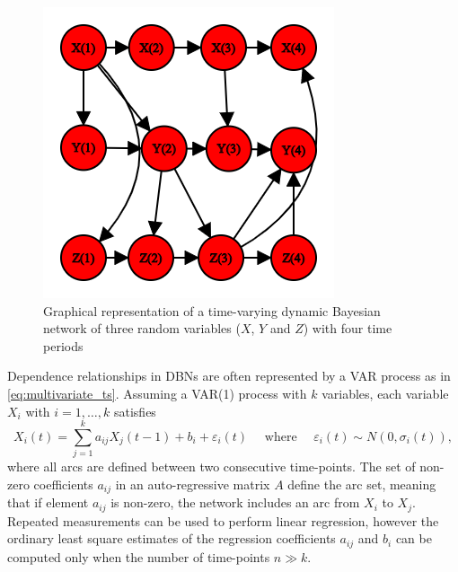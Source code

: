 \begin{figure}[H]
\centering
  \includegraphics[width=0.45\linewidth]{figures/dynamic_bn.png}
  \caption{Graphical representation of a time-varying dynamic Bayesian network of three random variables ($X$, $Y$ and $Z$) with four time periods}
  \label{fig:dynamic_bn}
\end{figure}


Dependence relationships in \acp{DBN} are often represented by a \ac{VAR} process as in \autoref{eq:multivariate_ts}. Assuming a \ac{VAR}(1) process with $k$ variables, each variable $X_i$ with $i = 1,\ldots,k$ satisfies
\begin{equation}
X_{i}(t)=\sum_{j=1}^{k} a_{i j} X_{j}(t-1)+b_{i}+\varepsilon_{i}(t) \quad \text { where } \quad \varepsilon_{i}(t) \sim N\left(0, \sigma_{i}(t)\right),
\end{equation}
where all arcs are defined between two consecutive time-points. The set of non-zero coefficients $a_{ij}$ in an auto-regressive matrix $A$ define the arc set, meaning that if element $a_{ij}$ is non-zero, the network includes an arc from $X_i$ to $X_j$. Repeated measurements can be used to perform linear regression, however the ordinary least square estimates of the regression coefficients $a_{ij}$ and $b_i$ can be computed only when the number of time-points $n \gg k$.





